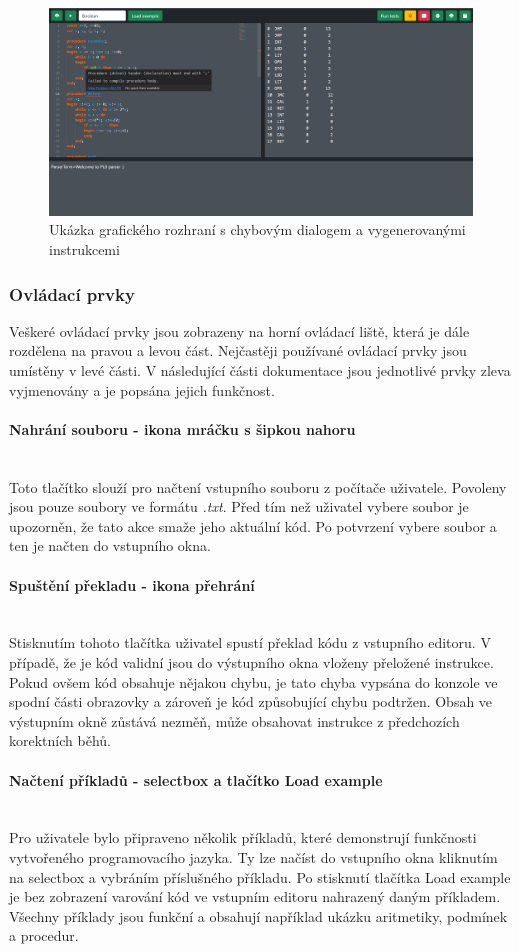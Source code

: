 \documentclass[12pt, letterpaper]{article}
\newcommand{\myparagraph}[1]{\paragraph{#1}\mbox{}\\}
\begin{document}
\begin{figure}[H]
	\centering
	\includegraphics[width=\linewidth]{img/gui.png}
	\caption{Ukázka grafického rozhraní s chybovým dialogem a vygenerovanými instrukcemi}
	\label{fig:GUI}
\end{figure}

\subsubsection{Ovládací prvky}
Veškeré ovládací prvky jsou zobrazeny na horní ovládací liště, která je dále rozdělena na pravou a levou část. Nejčastěji používané ovládací prvky jsou umístěny v levé části. V následující části dokumentace jsou jednotlivé prvky zleva vyjmenovány a je popsána jejich funkčnost.

\myparagraph{Nahrání souboru - ikona mráčku s šipkou nahoru}
Toto tlačítko slouží pro načtení vstupního souboru z počítače uživatele. Povoleny jsou pouze soubory ve formátu \textit{.txt}. Před tím než uživatel vybere soubor je upozorněn, že tato akce smaže jeho aktuální kód. Po potvrzení vybere  soubor a ten je načten do vstupního okna.

\myparagraph{Spuštění překladu - ikona přehrání}
Stisknutím tohoto tlačítka uživatel spustí překlad kódu z vstupního editoru. V případě, že je kód validní jsou do výstupního okna vloženy přeložené instrukce. Pokud ovšem kód obsahuje nějakou chybu, je tato chyba vypsána do konzole ve spodní části obrazovky a zároveň je kód způsobující chybu podtržen. Obsah ve výstupním okně zůstává nezměň, může obsahovat instrukce z předchozích korektních běhů.

\myparagraph{Načtení příkladů - selectbox a tlačítko Load example}
Pro uživatele bylo připraveno několik příkladů, které demonstrují funkčnosti vytvořeného programovacího jazyka. Ty lze načíst do vstupního okna kliknutím na selectbox a vybráním příslušného příkladu. Po stisknutí tlačítka Load example je bez zobrazení varování kód ve vstupním editoru nahrazený daným příkladem. Všechny příklady jsou funkční a obsahují například ukázku aritmetiky, podmínek a procedur.
\end{document}
